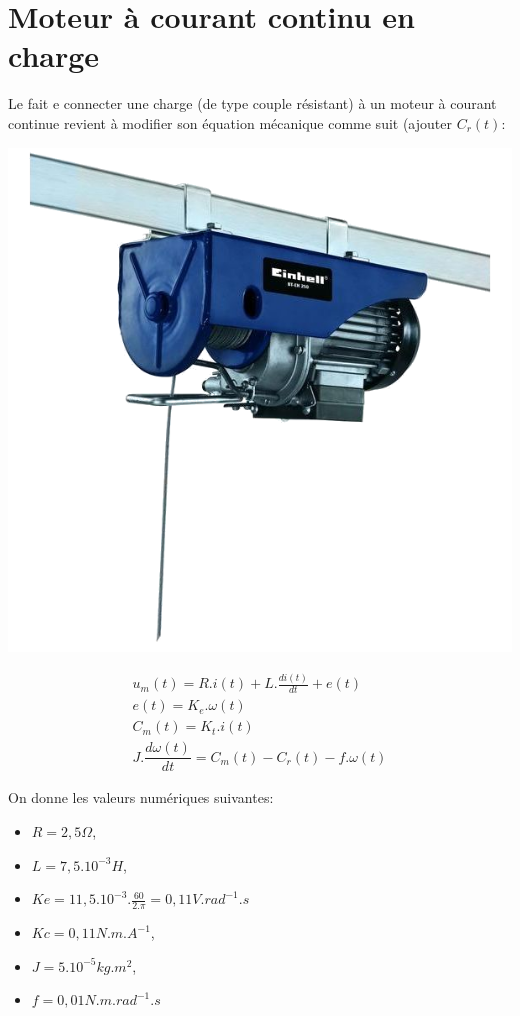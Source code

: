 \newpage

\section{Moteur à courant continu en charge}

Le fait e connecter une charge (de type couple résistant) à un moteur à courant continue revient à modifier son équation mécanique comme suit (ajouter $C_r(t)$:

\begin{minipage}{0.40\linewidth}
 \includegraphics[width=0.8\linewidth]{img/treuil}
\end{minipage}\hfill
\begin{minipage}{0.50\linewidth}
\begin{eqnarray}
u_m(t)=R.i(t)+L.\frac{di(t)}{dt}+e(t) \\
e(t)=K_e.\omega(t) \\ 
C_m(t)=K_t.i(t) \\
J.\dfrac{d\omega (t)}{dt}=C_m(t)-C_r(t)-f.\omega(t)
\end{eqnarray}
\end{minipage}

On donne les valeurs numériques suivantes:\\
\begin{minipage}{0.45\linewidth}
\begin{itemize}
 \item $R=2,5\Omega$,
 \item $L=7,5.10^{-3}H$,
 \item $Ke=11,5.10^{-3}.\frac{60}{2.\pi}=0,11 V.rad^{-1}.s$
\end{itemize}
\end{minipage}\hfill
\begin{minipage}{0.45\linewidth}
\begin{itemize}
 \item $Kc=0,11N.m.A^{-1}$,
 \item $J=5.10^{-5}kg.m^2$,
 \item $f=0,01N.m.rad^{-1}.s$
\end{itemize}
\end{minipage}

